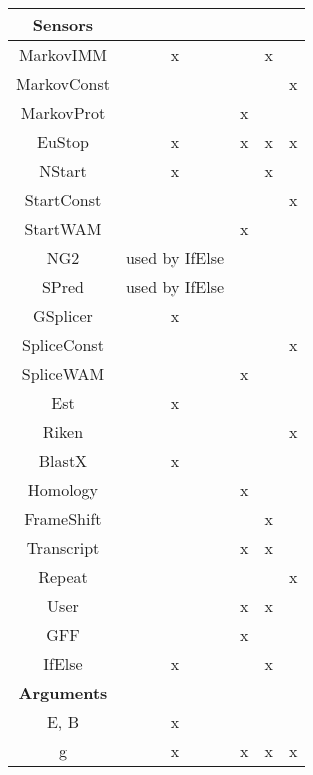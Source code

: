 \documentclass[a4paper,11pt]{article}
\begin{document}
\begin{center}
\begin{tabular}{|c|c|c|c|c|}
{\bf Sensors}& & & & \\ \hline \hline
MarkovIMM      &       x        &                   &     x    &   \\ \hline
MarkovConst    &                &                   &          & x  \\ \hline
MarkovProt     &                &        x          &          &    \\ \hline
EuStop         &       x        &        x          &     x    & x \\ \hline
NStart         &       x        &                   &     x    &   \\ \hline
StartConst     &                &                   &          & x  \\ \hline
StartWAM       &                &        x          &          &    \\ \hline
NG2            & used by IfElse &                   &          &   \\  \hline
SPred          & used by IfElse &                   &          &   \\  \hline
GSplicer       &       x        &                   &          &   \\ \hline
SpliceConst    &                &                   &          & x  \\ \hline
SpliceWAM      &                &        x          &          &    \\ \hline
Est            &       x        &                   &          &   \\  \hline
Riken          &                &                   &          & x  \\ \hline
BlastX         &       x        &                   &          &   \\  \hline
Homology       &                &        x          &          &    \\ \hline
FrameShift     &                &                   &    x     &    \\ \hline
Transcript     &                &        x          &    x     &    \\ \hline
Repeat         &                &                   &          & x  \\ \hline
User           &                &        x          &    x     &    \\ \hline
GFF            &                &        x          &          &    \\ \hline
IfElse         &       x        &                   &    x     &   \\ \hline \hline

{\bf Arguments}& & & & \\ \hline \hline
E, B           &       x        &                   &          &   \\ \hline 
g              &       x        &        x          &    x     & x \\ \hline
\end{tabular}
\end{center}
\vspace{0.5cm}
\end{document}
